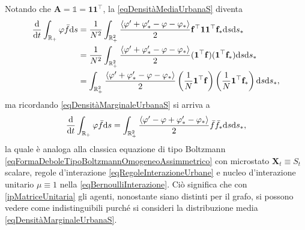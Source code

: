                 Notando che \(\mathbf A=\mathbb1=\mathbf1\mathbf1^\top\), la \ref{eqDensitàMediaUrbanaS} diventa
                \begin{equation*}
                    \begin{aligned}
                        \frac{\mathrm{d}}{\mathrm{d}t}\int_{\mathbb R_+}\varphi\bar f\mathrm{d} s
                        &=\frac1{N^2}\int_{\mathbb R_+^2}
                        \frac{\langle\varphi'+\varphi'_*-\varphi-\varphi_*\rangle}2
                        \mathbf f^\top\mathbf1\mathbf1^\top\mathbf f_*\mathrm{d} s\mathrm{d} s_*\\
                        &=\frac1{N^2}\int_{\mathbb R_+^2}
                        \frac{\langle\varphi'+\varphi'_*-\varphi-\varphi_*\rangle}2
                        (\mathbf1^\top\mathbf f)(\mathbf1^\top\mathbf f_*)\mathrm{d} s\mathrm{d} s_*\\
                        &=\int_{\mathbb R_+^2}
                        \frac{\langle\varphi'+\varphi'_*-\varphi-\varphi_*\rangle}2
                        \left(\frac1N\mathbf1^\top\mathbf f\right)
                        \left(\frac1N\mathbf1^\top\mathbf f_*\right)\mathrm{d} s\mathrm{d} s_*,
                    \end{aligned}
                \end{equation*}
                ma ricordando \cref{eqDensitàMarginaleUrbanaS} si arriva a
                \begin{equation}
                    \label{eqTipoBoltzmannConGrafoUnitario}
                    \frac{\mathrm{d}}{\mathrm{d}t}\int_{\mathbb R_+}\varphi\bar f\mathrm{d} s=
                    \int_{\mathbb R_+^2}
                    \frac{\langle\varphi'-\varphi+\varphi'_*-\varphi_*\rangle}2
                    \bar f\bar f_*\mathrm{d} s\mathrm{d} s_*,
                \end{equation}
                la quale è analoga alla classica equazione di tipo Boltzmann \ref{eqFormaDeboleTipoBoltzmannOmogeneoAssimmetrico} con microstato \(\mathbf X_t\equiv S_t\) scalare, regole d'interazione \ref{eqRegoleInterazioneUrbane} e nucleo d'interazione unitario\footnotemark{} \(\mu\equiv1\) nella \ref{eqBernoulliInterazione}. Ciò significa che con \ref{ipMatriceUnitaria} gli agenti, nonostante siano distinti per il grafo, si possono vedere come indistinguibili purché si consideri la distribuzione media \eqref{eqDensitàMarginaleUrbanaS}.%

